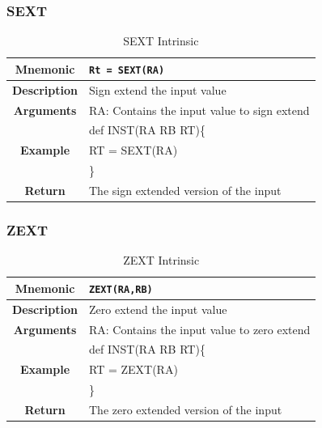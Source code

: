 \documentclass{article}
\begin{document}
\clearpage
\subsubsection{SEXT}
\label{sec:SEXT}

\begin{table}[h]
\begin{center}
\caption{SEXT Intrinsic}
\vspace{0.125in}
\label{tab:SEXTIntrinsic}
\begin{tabular}{|c|l|}
\hline
\textbf{Mnemonic} & \texttt{Rt = SEXT(RA)}\\
\hline
\textbf{Description} & Sign extend the input value\\
\hline
\textbf{Arguments} & RA: Contains the input value to sign extend\\
\hline
\multirow{3}{*}{\textbf{Example}} & def INST(RA RB RT)\{\\
                          			  &   RT = SEXT(RA)\\
                                                    & \}\\
\hline
\textbf{Return} & The sign extended version of the input\\                                                    
\hline
\end{tabular}
\end{center}
\end{table}

\clearpage
\subsubsection{ZEXT}
\label{sec:ZEXT}

\begin{table}[h]
\begin{center}
\caption{ZEXT Intrinsic}
\vspace{0.125in}
\label{tab:ZEXTIntrinsic}
\begin{tabular}{|c|l|}
\hline
\textbf{Mnemonic} & \texttt{ZEXT(RA,RB)}\\
\hline
\textbf{Description} & Zero extend the input value\\
\hline
\textbf{Arguments} & RA: Contains the input value to zero extend\\
\hline
\multirow{3}{*}{\textbf{Example}} & def INST(RA RB RT)\{\\
                          			  &   RT = ZEXT(RA)\\
                                                    & \}\\
\hline
\textbf{Return} & The zero extended version of the input\\                                                    
\hline
\end{tabular}
\end{center}
\end{table}
\end{document}
